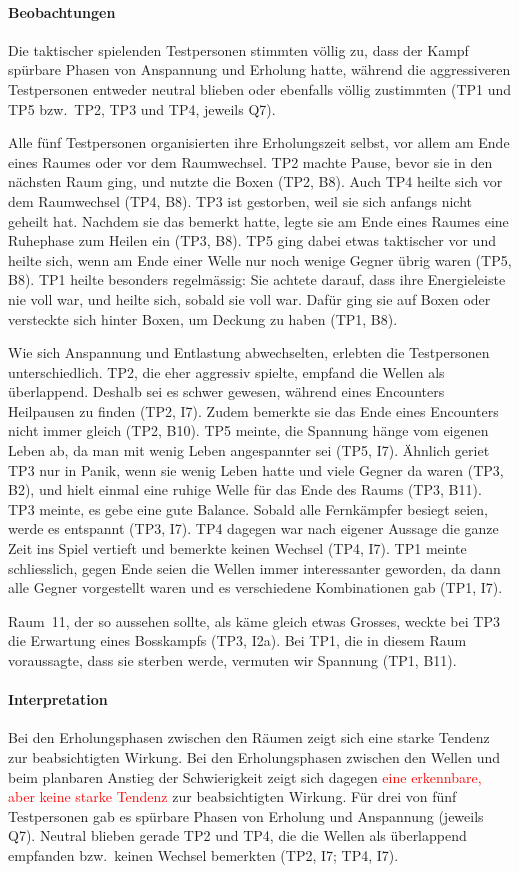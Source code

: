 \documentclass[../Main.tex]{subfiles}
\begin{document}
\paragraph{Beobachtungen}
Die taktischer spielenden Testpersonen stimmten völlig zu, dass der Kampf spürbare Phasen von Anspannung und Erholung hatte, während die aggressiveren Testpersonen entweder neutral blieben oder ebenfalls völlig zustimmten (TP1 und TP5 bzw.\ TP2, TP3 und TP4, jeweils Q7).

Alle fünf Testpersonen organisierten ihre Erholungszeit selbst, vor allem am Ende eines Raumes oder vor dem Raumwechsel. TP2 machte Pause, bevor sie in den nächsten Raum ging, und nutzte die Boxen (TP2, B8). Auch TP4 heilte sich vor dem Raumwechsel (TP4, B8). TP3 ist gestorben, weil sie sich anfangs nicht geheilt hat. Nachdem sie das bemerkt hatte, legte sie am Ende eines Raumes eine Ruhephase zum Heilen ein (TP3, B8). TP5 ging dabei etwas taktischer vor und heilte sich, wenn am Ende einer Welle nur noch wenige Gegner übrig waren (TP5, B8). TP1 heilte besonders regelmässig: Sie achtete darauf, dass ihre Energieleiste nie voll war, und heilte sich, sobald sie voll war. Dafür ging sie auf Boxen oder versteckte sich hinter Boxen, um Deckung zu haben (TP1, B8).

Wie sich Anspannung und Entlastung abwechselten, erlebten die Testpersonen unterschiedlich. TP2, die eher aggressiv spielte, empfand die Wellen als überlappend. Deshalb sei es schwer gewesen, während eines Encounters Heilpausen zu finden (TP2, I7). Zudem bemerkte sie das Ende eines Encounters nicht immer gleich (TP2, B10). TP5 meinte, die Spannung hänge vom eigenen Leben ab, da man mit wenig Leben angespannter sei (TP5, I7). Ähnlich geriet TP3 nur in Panik, wenn sie wenig Leben hatte und viele Gegner da waren (TP3, B2), und hielt einmal eine ruhige Welle für das Ende des Raums (TP3, B11). TP3 meinte, es gebe eine gute Balance. Sobald alle Fernkämpfer besiegt seien, werde es entspannt (TP3, I7). TP4 dagegen war nach eigener Aussage die ganze Zeit ins Spiel vertieft und bemerkte keinen Wechsel (TP4, I7). TP1 meinte schliesslich, gegen Ende seien die Wellen immer interessanter geworden, da dann alle Gegner vorgestellt waren und es verschiedene Kombinationen gab (TP1, I7).

Raum~11, der so aussehen sollte, als käme gleich etwas Grosses, weckte bei TP3 die Erwartung eines Bosskampfs (TP3, I2a). Bei TP1, die in diesem Raum voraussagte, dass sie sterben werde, vermuten wir Spannung (TP1, B11).

\paragraph{Interpretation}
Bei den Erholungsphasen zwischen den Räumen zeigt sich eine starke Tendenz zur beabsichtigten Wirkung. Bei den Erholungsphasen zwischen den Wellen und beim planbaren Anstieg der Schwierigkeit zeigt sich dagegen \textcolor{red}{eine erkennbare, aber keine starke Tendenz} zur beabsichtigten Wirkung. Für drei von fünf Testpersonen gab es spürbare Phasen von Erholung und Anspannung (jeweils Q7). Neutral blieben gerade TP2 und TP4, die die Wellen als überlappend empfanden bzw.\ keinen Wechsel bemerkten (TP2, I7; TP4, I7).
\end{document}
